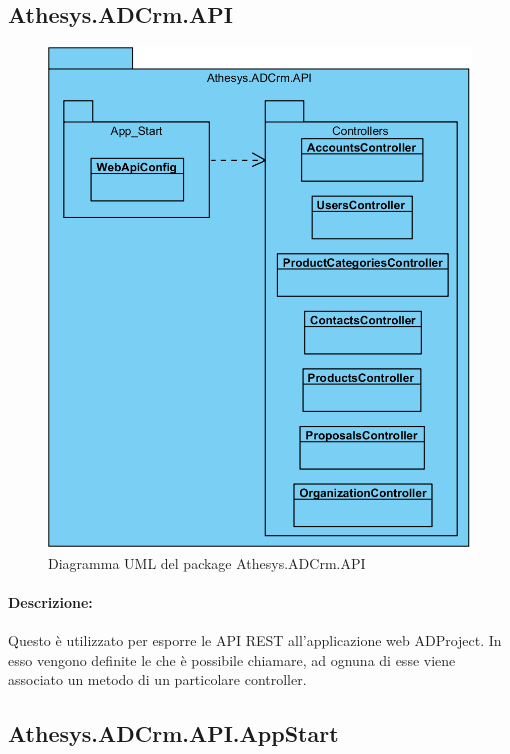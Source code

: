 \subsection{Athesys.ADCrm.API}
\begin{figure}[H]
	\centering
	\includegraphics[width=\linewidth]{images/modules/API}
	\caption{Diagramma UML del package Athesys.ADCrm.API}
	\label{fig:api}
\end{figure}
\paragraph{Descrizione:} 
Questo  è utilizzato per esporre le API REST all'applicazione web ADProject. In esso vengono definite le  che è possibile chiamare, ad ognuna di esse viene associato un metodo di un particolare controller. 





\subsection{Athesys.ADCrm.API.AppStart}
